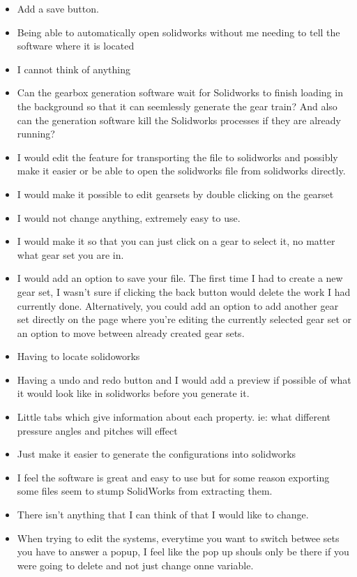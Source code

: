 \begin{itemize}
\item Add a save button.
\item Being able to automatically open solidworks without me needing to tell the software where it is located
\item I cannot think of anything 
\item Can the gearbox generation software wait for Solidworks to finish loading in the background so that it can seemlessly generate the gear train?  And also can the generation software kill the Solidworks processes if they are already running?
\item I would edit the feature for transporting the file to solidworks and possibly make it easier or be able to open the solidworks file from solidworks directly. 
\item I would make it possible to edit gearsets by double clicking on the gearset
\item I would not change anything, extremely easy to use. 
\item I would make it so that you can just click on a gear to select it, no matter what gear set you are in. 
\item I would add an option to save your file. The first time I had to create a new gear set, I wasn't sure if clicking the back button would delete the work I had currently done. Alternatively, you could add an option to add another gear set directly on the page where you're editing the currently selected gear set or an option to move between already created gear sets.
\item Having to locate solidoworks
\item Having a undo and redo button and I would add a preview if possible of what it would look like in solidworks before you generate it.
\item Little tabs which give information about each property. ie: what different pressure angles and pitches will effect
\item Just make it easier to generate the configurations into solidworks
\item I feel the software is great and easy to use but for some reason exporting some files seem to stump SolidWorks from extracting them. 
\item There isn't anything that I can think of that I would like to change. 
\item When trying to edit the systems, everytime you want to switch betwee sets you have to answer a popup, I feel like the pop up shouls only be there if you were going to delete and not just change onne variable.

\end{itemize}
